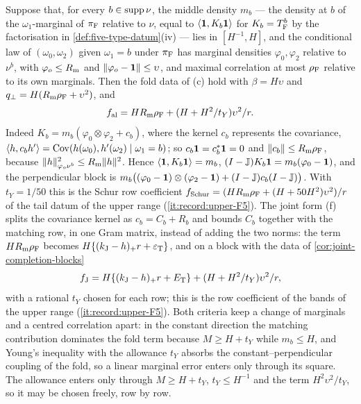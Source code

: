 \begin{remark}\label{rem:five-type-fold-data}
Suppose that, for every $b\in\supp\nu$, the middle density $m_b$ --- the
density at $b$ of the $\omega_1$-marginal of $\pi_{\rm F}$ relative to
$\nu$, equal to $\ip\one{K_b\one}$ for $K_b=T_{\rm F}^b$ by the
factorisation in \cref{def:five-type-datum}(iv) --- lies in $[H^{-1},H]$, and the conditional law of $(\omega_0,\omega_2)$ given
$\omega_1=b$ under $\pi_{\rm F}$ has marginal densities $\varphi_0,\varphi_2$
relative to $\nu^b$, with $\varphi_o\le R_{\rm m}$ and
$\|\varphi_o-\one\|\le\upsilon$, and maximal correlation at most $\rho_{\rm F}$
relative to its own marginals. Then the fold data of (c) hold with
$\beta=H\upsilon$ and $q_\perp=H(R_{\rm m}\rho_{\rm F}+\upsilon^2)$, and
\[
 f_{\rm al}=\frac{HR_{\rm m}\rho_{\rm F}+(H+H^2/t_Y)\upsilon^2}{r} .
\]
Indeed $K_b=m_b(\varphi_0\otimes\varphi_2+c_b)$, where the kernel $c_b$ represents
the covariance, $\ip h{c_bh'}=\operatorname{Cov}(h(\omega_0),h'(\omega_2)\mid\omega_1=b)$;
so $c_b\one=c_b^*\one=0$ and $\|c_b\|\le R_{\rm m}\rho_{\rm F}$, because
$\|h\|^2_{\varphi_o\nu^b}\le R_{\rm m}\|h\|^2$. Hence $\ip\one{K_b\one}=m_b$,
$(I-\Jproj)K_b\one=m_b(\varphi_0-\one)$, and the perpendicular block is
$m_b\bigl((\varphi_0-\one)\otimes(\varphi_2-\one)+(I-\Jproj)c_b(I-\Jproj)\bigr)$. With
$t_Y=1/50$ this is the Schur row coefficient
$f_{\rm Schur}=(HR_{\rm m}\rho_{\rm F}+(H+50H^2)\upsilon^2)/r$ of the tail datum of the
upper range (\ref{it:record:upper-F5}). The joint form (f) splits the
covariance kernel as $c_b=C_b+R_b$ and bounds $C_b$ together with the matching
row, in one Gram matrix, instead of adding the two norms: the term
$HR_{\rm m}\rho_{\rm F}$ becomes $H\{(k_{\rm J}-h)_+r+\eps_{\rm T}\}$, and on a block
with the data of \cref{cor:joint-completion-blocks}
\[
 f_{\rm J}=\frac{H\{(k_{\rm J}-h)_+r+E_{\rm T}\}+(H+H^2/t_Y)\upsilon^2}{r},
\]
with a rational $t_Y$ chosen for each row; this is the row coefficient of the
bands of the upper range (\ref{it:record:upper-F5}). Both criteria keep a
change of marginals and a centred correlation apart: in the constant direction the
matching contribution dominates the fold term because $M\ge H+t_Y$ while
$m_b\le H$, and Young's inequality with the allowance $t_Y$ absorbs the
constant--perpendicular coupling of the fold, so a linear marginal error
enters only through its square. The allowance enters only through
$M\ge H+t_Y$, $t_Y\le H^{-1}$ and the term $H^2\upsilon^2/t_Y$, so
it may be chosen freely, row by row.
\end{remark}

